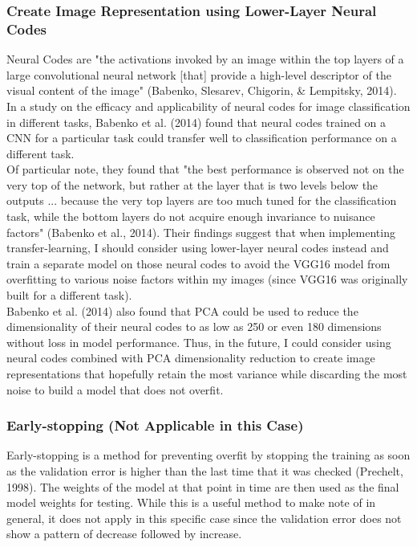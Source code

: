 \documentclass[11pt]{article}
\begin{document}
\subsubsection*{Create Image Representation using Lower-Layer Neural Codes}

Neural Codes are "the activations invoked by an image within the top
layers of a large convolutional neural network {[}that{]} provide a
high-level descriptor of the visual content of the image" (Babenko,
Slesarev, Chigorin, \& Lempitsky, 2014). In a study on the efficacy and
applicability of neural codes for image classification in different
tasks, Babenko et al. (2014) found that neural codes trained on a CNN
for a particular task could transfer well to classification performance
on a different task.\\

Of particular note, they found that "the best performance is observed
not on the very top of the network, but rather at the layer that is two
levels below the outputs ... because the very top layers are too much
tuned for the classification task, while the bottom layers do not
acquire enough invariance to nuisance factors" (Babenko et al., 2014).
Their findings suggest that when implementing transfer-learning, I
should consider using lower-layer neural codes instead and train a
separate model on those neural codes to avoid the VGG16 model from
overfitting to various noise factors within my images (since VGG16 was
originally built for a different task).\\

Babenko et al. (2014) also found that PCA could be used to reduce the
dimensionality of their neural codes to as low as 250 or even 180
dimensions without loss in model performance. Thus, in the future, I
could consider using neural codes combined with PCA dimensionality
reduction to create image representations that hopefully retain the most
variance while discarding the most noise to build a model that does not
overfit.

\subsubsection*{Early-stopping (Not Applicable in this Case)}

Early-stopping is a method for preventing overfit by stopping the
training as soon as the validation error is higher than the last time
that it was checked (Prechelt, 1998). The weights of the model at that
point in time are then used as the final model weights for testing.
While this is a useful method to make note of in general, it does not
apply in this specific case since the validation error does not show a
pattern of decrease followed by increase.
\newpage
\end{document}
